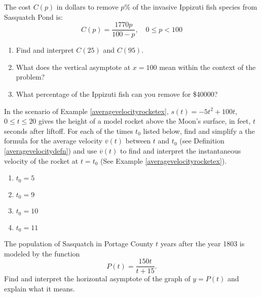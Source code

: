 \documentclass{ximera}
\begin{document}
\begin{problem}
The cost $C(p)$ in dollars to remove $p$\% of the invasive  Ippizuti fish species from Sasquatch Pond is: \[C(p) = \frac{1770p}{100 - p}, \quad 0 \leq p < 100 \]

\begin{enumerate}

\item Find and interpret $C(25)$ and $C(95)$.
\item What does the vertical asymptote at $x = 100$ mean within the context of the problem?
\item What percentage of the Ippizuti fish can you remove for  \$40000?

\end{enumerate}
\end{problem}

\begin{problem}
In the scenario of  Example \ref{averagevelocityrocketex}, $s(t) = -5t^2+100t$, $0 \leq t \leq 20$ gives the height of a model rocket above the Moon's surface, in feet,  $t$ seconds after liftoff.  For each of the times $t_{0}$ listed below, find and simplify a the formula for the average velocity $\overline{v}(t)$ between $t$ and $t_{0}$ (see Definition \ref{averagevelocitydefn}) and use $\overline{v}(t)$ to find and interpret the instantaneous velocity of the rocket at $t = t_{0}$ (See Example \ref{averagevelocityrocketex}).

\begin{enumerate}

\item  $t_{0} = 5$

\item $t_{0} = 9$

\item $t_{0} = 10$

\item  $t_{0} = 11$

\end{enumerate}
\end{problem}

\begin{problem}\label{squatchpop}
The population of Sasquatch in Portage County $t$ years after the year 1803 is modeled by the function \[P(t) = \frac{150t}{t + 15}.\] Find and interpret the horizontal asymptote of the graph of $y = P(t)$ and explain what it means.
\end{problem}
\end{document}
